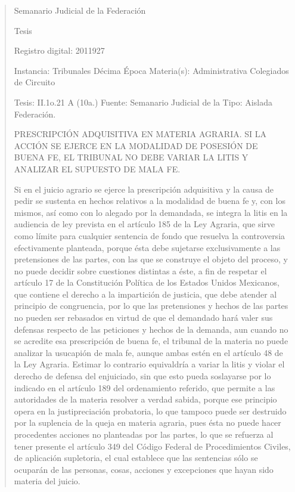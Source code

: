 \documentclass[11pt,a4paper]{article}
\begin{document}
\begin{quote}
                                                   Semanario Judicial de la Federación

                                                Tesis

 Registro digital: 2011927

 Instancia: Tribunales             Décima Época                           Materia(s): Administrativa
 Colegiados de Circuito

 Tesis: II.1o.21 A (10a.)          Fuente: Semanario Judicial de la       Tipo: Aislada
                                   Federación.


PRESCRIPCIÓN ADQUISITIVA EN MATERIA AGRARIA. SI LA ACCIÓN SE EJERCE EN LA
MODALIDAD DE POSESIÓN DE BUENA FE, EL TRIBUNAL NO DEBE VARIAR LA LITIS Y
ANALIZAR EL SUPUESTO DE MALA FE.


Si en el juicio agrario se ejerce la prescripción adquisitiva y la causa de pedir se sustenta en hechos
relativos a la modalidad de buena fe y, con los mismos, así como con lo alegado por la demandada,
se integra la litis en la audiencia de ley prevista en el artículo 185 de la Ley Agraria, que sirve como
límite para cualquier sentencia de fondo que resuelva la controversia efectivamente planteada,
porque ésta debe sujetarse exclusivamente a las pretensiones de las partes, con las que se
construye el objeto del proceso, y no puede decidir sobre cuestiones distintas a éste, a fin de
respetar el artículo 17 de la Constitución Política de los Estados Unidos Mexicanos, que contiene el
derecho a la impartición de justicia, que debe atender al principio de congruencia, por lo que las
pretensiones y hechos de las partes no pueden ser rebasados en virtud de que el demandado hará
valer sus defensas respecto de las peticiones y hechos de la demanda, aun cuando no se acredite
esa prescripción de buena fe, el tribunal de la materia no puede analizar la usucapión de mala fe,
aunque ambas estén en el artículo 48 de la Ley Agraria. Estimar lo contrario equivaldría a variar la
litis y violar el derecho de defensa del enjuiciado, sin que esto pueda soslayarse por lo indicado en
el artículo 189 del ordenamiento referido, que permite a las autoridades de la materia resolver a
verdad sabida, porque ese principio opera en la justipreciación probatoria, lo que tampoco puede
ser destruido por la suplencia de la queja en materia agraria, pues ésta no puede hacer procedentes
acciones no planteadas por las partes, lo que se refuerza al tener presente el artículo 349 del
Código Federal de Procedimientos Civiles, de aplicación supletoria, el cual establece que las
sentencias sólo se ocuparán de las personas, cosas, acciones y excepciones que hayan sido
materia del juicio.


\end{quote}
\end{document}
